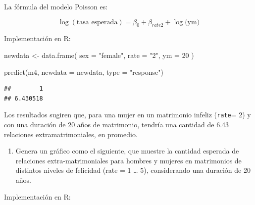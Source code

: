 \documentclass[
  12pt,
  a4paper,
]{article}
\newenvironment{Shaded}{\begin{snugshade}}{\end{snugshade}}
\newcommand{\AttributeTok}[1]{\textcolor[rgb]{0.77,0.63,0.00}{#1}}
\newcommand{\DecValTok}[1]{\textcolor[rgb]{0.00,0.00,0.81}{#1}}
\newcommand{\FunctionTok}[1]{\textcolor[rgb]{0.00,0.00,0.00}{#1}}
\newcommand{\NormalTok}[1]{#1}
\newcommand{\OtherTok}[1]{\textcolor[rgb]{0.56,0.35,0.01}{#1}}
\newcommand{\StringTok}[1]{\textcolor[rgb]{0.31,0.60,0.02}{#1}}
\providecommand{\tightlist}{%
  \setlength{\itemsep}{0pt}\setlength{\parskip}{0pt}}
\begin{document}
La fórmula del modelo Poisson es:

\[
\log(\text{tasa esperada}) = \beta_0 + \beta_{rate2} + \log\text{(ym)}
\]

Implementación en R:

\begin{Shaded}
\begin{Highlighting}[]
\NormalTok{newdata }\OtherTok{\textless{}{-}} \FunctionTok{data.frame}\NormalTok{(}
  \AttributeTok{sex =} \StringTok{"female"}\NormalTok{,}
  \AttributeTok{rate =} \StringTok{"2"}\NormalTok{,}
  \AttributeTok{ym =} \DecValTok{20}
\NormalTok{)}

\FunctionTok{predict}\NormalTok{(m4, }
        \AttributeTok{newdata =}\NormalTok{ newdata, }
        \AttributeTok{type =} \StringTok{"response"}\NormalTok{)}
\end{Highlighting}
\end{Shaded}

\begin{verbatim}
##        1 
## 6.430518
\end{verbatim}

Los resultados sugiren que, para una mujer en un matrimonio infeliz (\texttt{rate}= 2) y con una duración de 20 años de matrimonio, tendría una cantidad de 6.43 relaciones extramatrimoniales, en promedio.

\begin{enumerate}
\def\labelenumi{\alph{enumi})}
\setcounter{enumi}{3}
\tightlist
\item
  Genera un gráfico como el siguiente, que muestre la cantidad esperada de relaciones extra-matrimoniales para hombres y mujeres en matrimonios de distintos niveles de felicidad (rate = 1 \ldots{} 5), considerando una duración de 20 años.
\end{enumerate}

Implementación en R:
\end{document}
